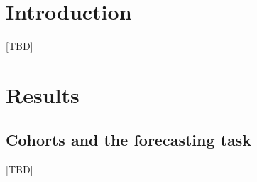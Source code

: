 \documentclass[pdflatex,sn-nature]{sn-jnl}
\begin{document}
\section{Introduction}\label{sec:intro}

[TBD]

\section{Results}\label{sec:results}

\subsection{Cohorts and the forecasting task}\label{sec:res-data}
[TBD]
\end{document}
